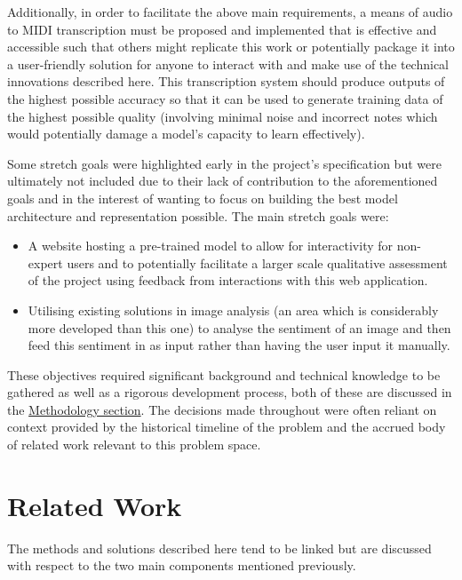 \documentclass[12pt,]{article}
\providecommand{\tightlist}{%
  \setlength{\itemsep}{0pt}\setlength{\parskip}{0pt}}
\begin{document}
Additionally, in order to facilitate the above main requirements, a
means of audio to MIDI transcription must be proposed and implemented
that is effective and accessible such that others might replicate this
work or potentially package it into a user-friendly solution for anyone
to interact with and make use of the technical innovations described
here. This transcription system should produce outputs of the highest
possible accuracy so that it can be used to generate training data of
the highest possible quality (involving minimal noise and incorrect
notes which would potentially damage a model's capacity to learn
effectively).

Some stretch goals were highlighted early in the project's specification
but were ultimately not included due to their lack of contribution to
the aforementioned goals and in the interest of wanting to focus on
building the best model architecture and representation possible. The
main stretch goals were:

\begin{itemize}
\tightlist
\item
  A website hosting a pre-trained model to allow for interactivity for
  non-expert users and to potentially facilitate a larger scale
  qualitative assessment of the project using feedback from interactions
  with this web application.
\item
  Utilising existing solutions in image analysis (an area which is
  considerably more developed than this one) to analyse the sentiment of
  an image and then feed this sentiment in as input rather than having
  the user input it manually.
\end{itemize}

These objectives required significant background and technical knowledge
to be gathered as well as a rigorous development process, both of these
are discussed in the \protect\hyperlink{methodology}{Methodology
section}. The decisions made throughout were often reliant on context
provided by the historical timeline of the problem and the accrued body
of related work relevant to this problem space.

\hypertarget{related-work}{%
\section{Related Work}\label{related-work}}

The methods and solutions described here tend to be linked but are
discussed with respect to the two main components mentioned previously.
\end{document}
